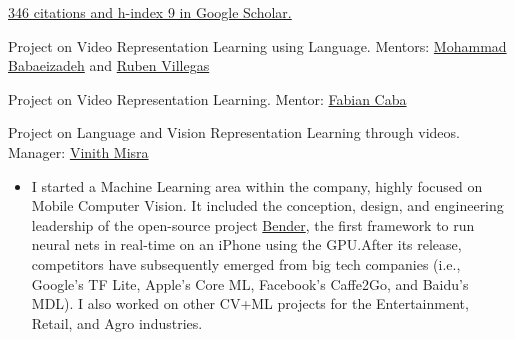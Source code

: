 \documentclass[10pt,a4paper,academicons]{altacv}
\begin{document}
\href{https://scholar.google.com/citations?user=i2LNBfUAAAAJ}{346 citations and h-index 9 in Google Scholar.}

\vspace{3mm}

\nocite{*}

{
\hypersetup{hidelinks}

\printbibliography[heading=pubtype,title={\printinfo{\faGroup}{Conference Proceedings}},type=inproceedings]

\pagebreak


\printbibliography[heading=pubtype,title={\printinfo{\faBook}{Journal Articles}},type=article]

\printbibliography[heading=pubtype,title={\printinfo{\faGraduationCap}{Theses}},type=thesis]

\printbibliography[heading=pubtype,title={\printinfo{\faGroup}{Workshop Proceedings}},type=incollection]

\printbibliography[heading=pubtype,title={\printinfo{\faAsterisk}{Non Refereed}},type=misc]
}



Project on Video Representation Learning using Language. Mentors: \href{https://web.engr.illinois.edu/~mb2}{Mohammad Babaeizadeh} and \href{https://rubenvillegas.me/}{Ruben Villegas}

\divider{}


Project on Video Representation Learning. Mentor: \href{https://fabiancaba.com/}{Fabian Caba}

\divider{}


Project on Language and Vision Representation Learning through videos. Manager: \href{https://vinmisra.github.io/}{Vinith Misra}

\divider{}


\begin{itemize}
  \item I started a Machine Learning area within the company, highly focused on Mobile Computer Vision. It included the conception, design, and engineering leadership of the open-source project {\href{https://github.com/xmartlabs/Bender}{Bender}}, the first framework to run neural nets in real-time on an iPhone using the GPU.\@ After its release, competitors have subsequently emerged from big tech companies (i.e., Google’s TF Lite, Apple’s Core ML, Facebook’s Caffe2Go, and Baidu’s MDL). I also worked on other CV+ML projects for the Entertainment, Retail, and Agro industries.
\end{itemize}
\end{document}
